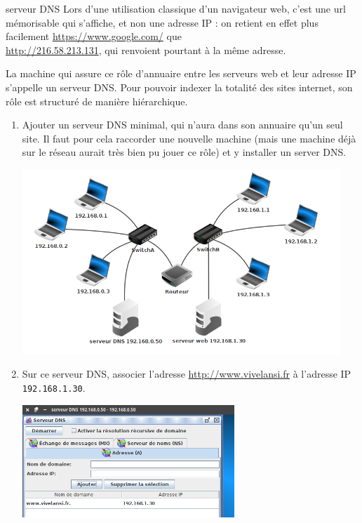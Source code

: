 \documentclass[a4paper,dvipsnames]{article}
\begin{document}
\begin{activite}[breakable]{serveur DNS}{}
  Lors d'une utilisation classique d'un navigateur web, c'est une url mémorisable qui s'affiche, et non une adresse IP : on retient en effet plus facilement \url{https://www.google.com/} que\\ \url{http://216.58.213.131}, qui renvoient pourtant à la même adresse. 

  \smallskip

  La machine qui assure ce rôle d'annuaire entre les serveurs web et leur adresse IP s'appelle un {\color{red}serveur DNS}. Pour pouvoir indexer la totalité des sites internet, son rôle est structuré de manière hiérarchique. 

  \begin{enumerate}
    \item Ajouter un serveur DNS minimal, qui n'aura dans son annuaire qu'un seul site. Il faut pour cela raccorder une nouvelle machine (mais une machine déjà sur le réseau aurait très bien pu jouer ce rôle) et y installer un server DNS.

      \begin{center}
	\includegraphics[width=12cm]{img/dns.png}
      \end{center}

    \item Sur ce serveur DNS, associer l'adresse \url{http://www.vivelansi.fr} à l'adresse IP \texttt{192.168.1.30}.

      \begin{center}
	\includegraphics[width=8cm]{img/vivelansi.png}
      \end{center}


\end{enumerate}
\end{activite}
\end{document}
